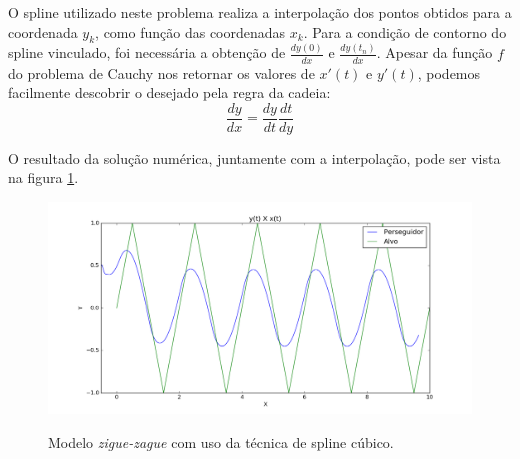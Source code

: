 \documentclass[a4paper,10pt]{article}
\begin{document}
  O spline utilizado neste problema realiza a interpolação dos pontos obtidos para a coordenada $y_k$, como função das coordenadas $x_k$. Para a condição de contorno do spline vinculado, foi necessária a obtenção de $\frac{dy(0)}{dx}$ e $\frac{dy(t_n)}{dx}$. Apesar da função $f$ do problema de Cauchy nos retornar os valores de $x'(t)$ e $y'(t)$, podemos facilmente descobrir o desejado pela regra da cadeia:
  \begin{equation}
   \frac{dy}{dx} = \frac{dy}{dt} \frac{dt}{dy}
  \end{equation}
  
  O resultado da solução numérica, juntamente com a interpolação, pode ser vista na figura \ref{fig:curva-zz}.
  
  \begin{figure}[H]
   \includegraphics[width=\textwidth]{zz-XY-spline.png}
   \label{fig:curva-zz}
   \caption{Modelo \emph{zigue-zague} com uso da técnica de spline cúbico.}
  \end{figure}  
  
\end{document}
